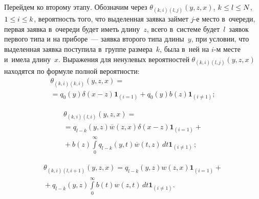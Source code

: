 \begin{multicols}{2}
Перейдем ко второму этапу.
Обозначим через $\theta_{(k,i)(l,j)}(y,z,x)$,
${k \hm\le l \hm\le N}$, ${1\hm \le i\hm \le k}$,
вероятность того, что
выделенная заявка займет $j$-е место в~очереди,
первая заявка в~очереди будет иметь длину~$z$,
всего в~системе будет~$l$~заявок первого типа
и на приборе~--- заявка второго типа длины~$y$, при условии,
что выделенная заявка поступила в~группе размера~$k$, была в~ней на $i$-м
месте и~имела длину~$x$.
Выражения для ненулевых вероятностей $\theta_{(k,i)(l,j)}(y,z,x)$
находятся по формуле полной вероятности:
\begin{multline*}
\theta_{(k,i)(k,i)}(y,z,x)={}\\
{}=q_0(y) \delta(x-z) \mathbf{1}_{(i=1)}
+ q_0(y) b(z) \mathbf{1}_{(i\neq 1)};
\end{multline*}
\vspace*{-12pt}

\noindent
\begin{multline*}
\theta_{(k,i)(l,i)}(y,z,x)={}\\
{}=q_{l-k}(y,z) 
\overline{w}(z,x) \delta(x-z) \mathbf{1}_{(i=1)}+{}\\
{}+ b(z)\int\limits_{0}^\infty q_{l-k}(y,t) 
\overline{w}(t,z) \,dt \mathbf{1}_{(i\neq 1)}\,;
\end{multline*}
\vspace*{-12pt}

\noindent
\begin{multline*}
\theta_{(k,i)(l,i+1)}(y,z,x)
=q_{l-k}(y,z) w(z,x) \mathbf{1}_{(i=1)}+ {}\\
{}+q_{l-k}(y,z)\int\limits_{0}^\infty 
b(t) w(z,t) \,dt \mathbf{1}_{(i\neq 1)}.
\end{multline*}


\end{multicols}
